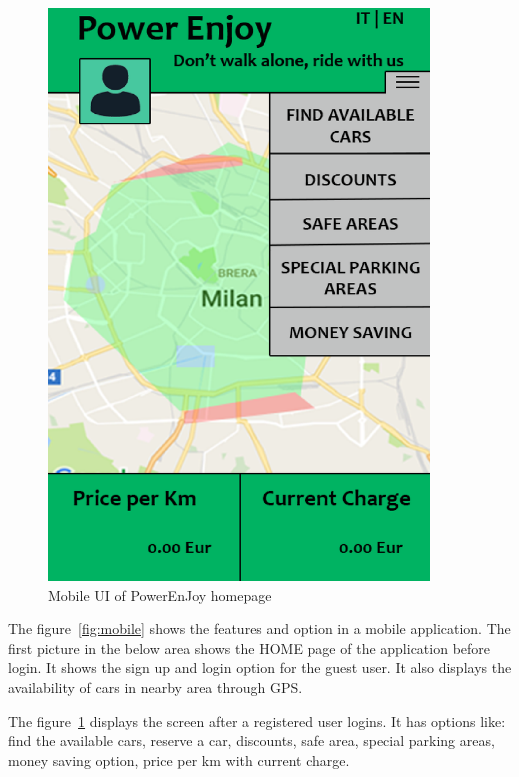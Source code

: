 \begin{figure}[t]
\begin{minipage}{0.45\textwidth}
		\includegraphics[width=0.9\textwidth]{figures/mobile_logged.eps}
		\caption{Mobile UI of PowerEnJoy homepage}
		\label{fig:mobile_logged}
	\end{minipage}
\end{figure}

The figure~\ref{fig:mobile} shows the features and option in a mobile application. The first picture in the below area shows the HOME page of the application before login. It shows the sign up and login option for the guest user. It also displays the availability of cars in nearby area through GPS.

The figure~\ref{fig:mobile_logged} displays the screen after a registered user logins. It has options like: find the available cars, reserve a car, discounts, safe area,	special parking areas, money saving option, price per km with current charge.


